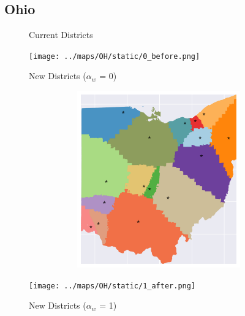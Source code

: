 \subsection{Ohio}
\begin{figure}[htb!] \centering
\caption{ Current Districts }
\texttt{[image: ../maps/OH/static/0\_before.png]}
\caption{ New Districts ($\alpha_w$ = 0) }
\includegraphics[width=5in,height=3in,keepaspectratio]{../maps/OH/static/0_after.png}
\caption{ New Districts ($\alpha_w$ = 1) }
\texttt{[image: ../maps/OH/static/1\_after.png]}
\end{figure}

\clearpage
\newpage

